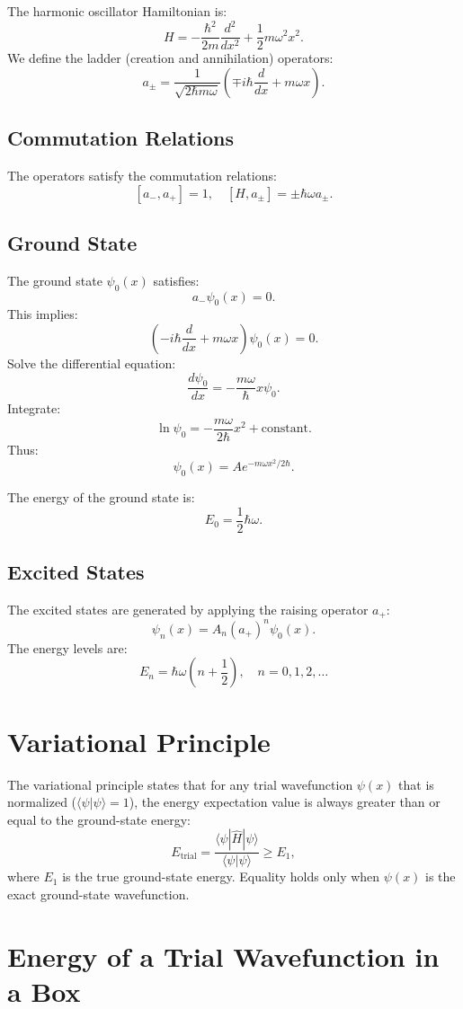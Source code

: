 \documentclass[a4paper,12pt]{article}
\begin{document}
\begin{multicols}{2}
The harmonic oscillator Hamiltonian is:
\[
H = -\frac{\hbar^2}{2m} \frac{d^2}{dx^2} + \frac{1}{2} m \omega^2 x^2.
\]
We define the ladder (creation and annihilation) operators:
\[
a_\pm = \frac{1}{\sqrt{2\hbar m \omega}} \left(\mp i \hbar \frac{d}{dx} + m \omega x\right).
\]

\subsection*{Commutation Relations}
The operators satisfy the commutation relations:
\[
[a_-, a_+] = 1, \quad [H, a_\pm] = \pm \hbar \omega a_\pm.
\]

\subsection*{Ground State}
The ground state \( \psi_0(x) \) satisfies:
\[
a_- \psi_0(x) = 0.
\]
This implies:
\[
\left(-i \hbar \frac{d}{dx} + m \omega x\right) \psi_0(x) = 0.
\]
Solve the differential equation:
\[
\frac{d \psi_0}{dx} = -\frac{m \omega}{\hbar} x \psi_0.
\]
Integrate:
\[
\ln \psi_0 = -\frac{m \omega}{2\hbar} x^2 + \text{constant}.
\]
Thus:
\[
\psi_0(x) = A e^{-m \omega x^2 / 2\hbar}.
\]

The energy of the ground state is:
\[
E_0 = \frac{1}{2} \hbar \omega.
\]

\subsection*{Excited States}
The excited states are generated by applying the raising operator \( a_+ \):
\[
\psi_n(x) = A_n (a_+)^n \psi_0(x).
\]
The energy levels are:
\[
E_n = \hbar \omega \left(n + \frac{1}{2}\right), \quad n = 0, 1, 2, \dots
\]


\section{Variational Principle}

The variational principle states that for any trial wavefunction \( \psi(x) \) that is normalized (\( \langle \psi | \psi \rangle = 1 \)), the energy expectation value is always greater than or equal to the ground-state energy:
\[
E_{\text{trial}} = \frac{\langle \psi | \hat{H} | \psi \rangle}{\langle \psi | \psi \rangle} \geq E_1,
\]
where \( E_1 \) is the true ground-state energy. Equality holds only when \( \psi(x) \) is the exact ground-state wavefunction.

\section{Energy of a Trial Wavefunction in a Box}


\end{multicols}
\end{document}
